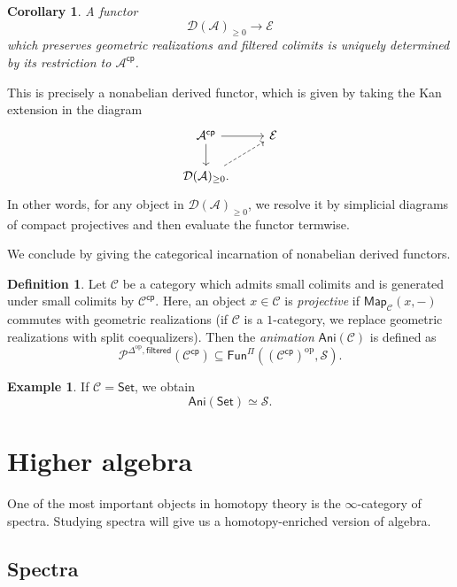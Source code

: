 \documentclass[10pt, oneside]{memoir}
\newtheorem{cor}[thm]{Corollary}
\theoremstyle{definition}
\newtheorem{defn}[thm]{Definition}
\newtheorem{exm}[thm]{Example}
\theoremstyle{remark}
\theoremstyle{plain}
\theoremstyle{definition}
\theoremstyle{remark}
\newcommand{\mc}[1]{\mathcal{#1}}
\newcommand{\ms}[1]{\mathsf{#1}}
\newcommand{\1}{\mathbf{1}}
\newcommand{\2}{\mathbf{2}}
\newcommand{\3}{\mathbf{3}}
\DeclareMathOperator{\op}{op}
\begin{document}
\begin{cor}
    A functor
    \[ \mc{D}(\mc{A})_{\geq 0} \to \mc{E} \]
    which preserves geometric realizations and filtered colimits is uniquely determined by its restriction to $\mc{A}^{\ms{cp}}$.
\end{cor}

This is precisely a nonabelian derived functor, which is given by taking the Kan extension in the diagram
\begin{equation*}
\begin{tikzcd}
    \mc{A}^{\ms{cp}} \ar{r} \ar{d} & \mc{E} \\
    \mc{D}(\mc{A})_{\geq 0} \ar[dashrightarrow]{ur}.
\end{tikzcd}
\end{equation*}
In other words, for any object in $\mc{D}(\mc{A})_{\geq 0}$, we resolve it by simplicial diagrams of compact projectives and then evaluate the functor termwise.

We conclude by giving the categorical incarnation of nonabelian derived functors.
\begin{defn}
    Let $\mc{C}$ be a category which admits small colimits and is generated under small colimits by $\mc{C}^{\ms{cp}}$. Here, an object $x \in \mc{C}$ is \textit{projective} if $\ms{Map}_{\mc{C}}(x,-)$ commutes with geometric realizations (if $\mc{C}$ is a $1$-category, we replace geometric realizations with split coequalizers). Then the \textit{animation} $\ms{Ani}(\mc{C})$ is defined as
    \[ \mc{P}^{\Delta^{\op}, \ms{filtered}}(\mc{C}^{\ms{cp}}) \subseteq \ms{Fun}^{\Pi} ((\mc{C}^{\ms{cp}})^{\op}, \mc{S}). \]
\end{defn}

\begin{exm}
    If $\mc{C} = \ms{Set}$, we obtain
    \[ \ms{Ani}(\ms{Set}) \simeq \mc{S}. \]
\end{exm}




\section{Higher algebra}%
\label{sec:Higher algebra}

One of the most important objects in homotopy theory is the $\infty$-category of spectra. Studying spectra will give us a homotopy-enriched version of algebra.

\subsection{Spectra}%
\label{sub:Spectra}
\end{document}
